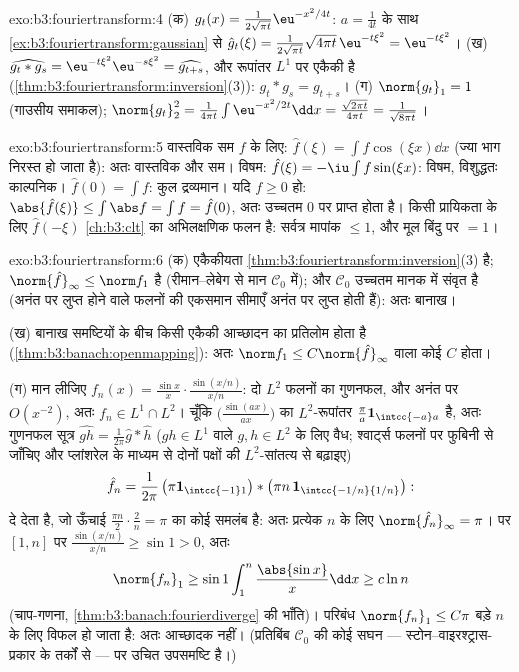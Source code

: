 \begin{solution}{exo:b3:fouriertransform:4}
(क) $g_t(x) = \frac1{2\sqrt{\pi t}}\eu^{-x^2/4t}$: $a = \frac1{4t}$ के साथ \cref{ex:b3:fouriertransform:gaussian} से $\hat g_t(\xi) = \frac1{2\sqrt{\pi t}}\sqrt{4\pi
t}\,\eu^{-t\xi^2} = \eu^{-t\xi^2}$।
(ख) $\widehat{g_t * g_s} = \eu^{-t\xi^2}\eu^{-s\xi^2} =
\widehat{g_{t+s}}$, और रूपांतर $L^1$ पर एकैकी है (\cref{thm:b3:fouriertransform:inversion}(3)): $g_t * g_s =
g_{t+s}$।
(ग) $\norm{g_t}_1 = 1$ (गाउसीय समाकल); $\norm{g_t}_2^2 = \frac1{4\pi t}\int\eu^{-x^2/2t}\dd x =
\frac{\sqrt{2\pi t}}{4\pi t} = \frac1{\sqrt{8\pi t}}$।
\end{solution}

\begin{solution}{exo:b3:fouriertransform:5}
वास्तविक सम $f$ के लिए: $\hat f(\xi) = \int f\cos(\xi x)\dd x$ (ज्या भाग निरस्त हो जाता है): अतः
वास्तविक और सम। विषम: $\hat f(\xi) =
-\iu\int f\sin(\xi x)$: विषम, विशुद्धतः काल्पनिक। $\hat f(0) =
\int f$: कुल
द्रव्यमान। यदि $f \geq 0$ हो: $\abs{\hat f(\xi)}
\leq \int\abs f = \int f = \hat f(0)$, अतः उच्चतम $0$ पर प्राप्त होता है।
किसी प्रायिकता  के लिए $\hat f(-\xi)$ \cref{ch:b3:clt} का अभिलक्षणिक फलन है: सर्वत्र
मापांक $\leq 1$, और मूल बिंदु पर $= 1$।
\end{solution}

\begin{solution}{exo:b3:fouriertransform:6}
(क) एकैकीयता \cref{thm:b3:fouriertransform:inversion}(3) है;  $\norm{\hat f}_\infty \leq \norm f_1$ है (रीमान--लेबेग से मान $\mathcal C_0$
में); और $\mathcal C_0$ उच्चतम मानक में संवृत है (अनंत पर लुप्त होने वाले फलनों
की एकसमान सीमाएँ अनंत पर लुप्त होती हैं): अतः बानाख।

(ख) बानाख समष्टियों के बीच किसी  एकैकी आच्छादन का प्रतिलोम 
होता है (\cref{thm:b3:banach:openmapping}): अतः $\norm f_1 \leq C\norm{\hat f}_\infty$ वाला कोई $C$ होता।

(ग) मान लीजिए $f_n(x) = \frac{\sin x}x\cdot\frac{\sin(x/n)}{x/n}$: दो $L^2$ फलनों का गुणनफल, और अनंत पर $O(x^{-2})$, अतः
$f_n \in L^1\cap L^2$। चूँकि $\bigl(\frac{\sin(ax)}{ax}\bigr)$ का $L^2$-रूपांतर $\frac\pi a\mathbf 1_{\intcc{-a}a}$ है, अतः गुणनफल सूत्र $\widehat{gh} = \frac1{2\pi}\hat g * \hat h$
($gh \in L^1$ वाले $g, h
\in L^2$ के लिए वैध; श्वार्ट्स फलनों पर फुबिनी से जाँचिए और
प्लांशरेल के माध्यम से दोनों पक्षों की $L^2$-सांतत्य से बढ़ाइए)
\[
\hat f_n = \frac1{2\pi}\,\bigl(\pi\mathbf
1_{\intcc{-1}1}\bigr) * \bigl(\pi n\,\mathbf
1_{\intcc{-1/n}{1/n}}\bigr):
\]
दे देता है, जो ऊँचाई $\frac{\pi n}2\cdot\frac2n = \pi$ का कोई समलंब है: अतः प्रत्येक $n$ के लिए
$\norm{\hat f_n}_\infty = \pi$। पर $[1,
n]$ पर $\frac{\sin(x/n)}{x/n} \geq \sin 1 > 0$, अतः
\[
\norm{f_n}_1 \geq \sin 1\int_1^n\frac{\abs{\sin x}}x\dd x
\geq c\ln n
\]
(चाप-गणना, \cref{thm:b3:banach:fourierdiverge} की भाँति)। परिबंध $\norm{f_n}_1 \leq C\pi$ बड़े $n$ के लिए विफल हो जाता
है: अतः आच्छादक नहीं। (प्रतिबिंब $\mathcal C_0$ की कोई सघन --- स्टोन--वाइरश्ट्रास-प्रकार
के तर्कों से --- पर उचित उपसमष्टि है।)
\end{solution}

